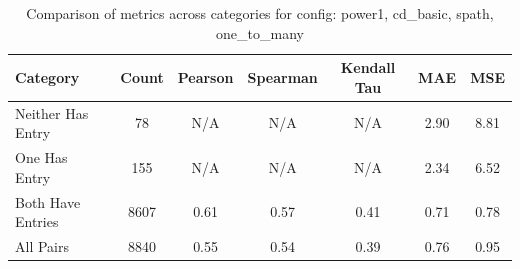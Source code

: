 \begin{table}[htbp]
\centering
\caption{Comparison of metrics across categories for config: power1, cd\_basic, spath, one\_to\_many}
\label{tab:config_comparison}
\begin{tabular}{|l|c|c|c|c|c|c|}
\hline
Category & Count & Pearson & Spearman & Kendall Tau & MAE & MSE \\
\hline
Neither Has Entry & 78 & N/A & N/A & N/A & 2.90 & 8.81 \\
\hline
One Has Entry & 155 & N/A & N/A & N/A & 2.34 & 6.52 \\
\hline
Both Have Entries & 8607 & 0.61 & 0.57 & 0.41 & 0.71 & 0.78 \\
\hline
All Pairs & 8840 & 0.55 & 0.54 & 0.39 & 0.76 & 0.95 \\
\hline
\end{tabular}
\end{table}